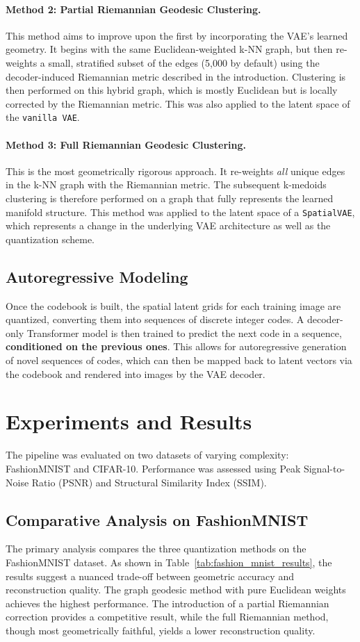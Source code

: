 \documentclass{article}
\begin{document}
\paragraph{Method 2: Partial Riemannian Geodesic Clustering.}
This method aims to improve upon the first by incorporating the VAE's learned geometry. 
It begins with the same Euclidean-weighted k-NN graph, but then re-weights a small, stratified subset of the edges (5,000 by default) using the decoder-induced Riemannian metric described in the introduction. 
Clustering is then performed on this hybrid graph, which is mostly Euclidean but is locally corrected by the Riemannian metric. This was also applied to the latent space of the \texttt{vanilla VAE}.
\paragraph{Method 3: Full Riemannian Geodesic Clustering.}
This is the most geometrically rigorous approach. It re-weights \textit{all} unique edges in the k-NN graph with the Riemannian metric. The subsequent k-medoids clustering is therefore performed on a graph that fully represents the learned manifold structure. This method was applied to the latent space of a \texttt{SpatialVAE}, which represents a change in the underlying VAE architecture as well as the quantization scheme.

\subsection{Autoregressive Modeling}
Once the codebook is built, the spatial latent grids for each training image are quantized, converting them into sequences of discrete integer codes. A decoder-only Transformer model is then trained to predict the next code in a sequence, \textbf{conditioned on the previous ones}. This allows for autoregressive generation of novel sequences of codes, which can then be mapped back to latent vectors via the codebook and rendered into images by the VAE decoder.

\section{Experiments and Results}
The pipeline was evaluated on two datasets of varying complexity: FashionMNIST and CIFAR-10.
Performance was assessed using Peak Signal-to-Noise Ratio (PSNR) and Structural Similarity Index (SSIM).
\subsection{Comparative Analysis on FashionMNIST}
The primary analysis compares the three quantization methods on the FashionMNIST dataset. 
As shown in Table~\ref{tab:fashion_mnist_results}, the results suggest a nuanced trade-off between geometric accuracy and reconstruction quality. The graph geodesic method with pure Euclidean weights achieves the highest performance. The introduction of a partial Riemannian correction provides a competitive result, while the full Riemannian method, though most geometrically faithful, yields a lower reconstruction quality.
\end{document}
